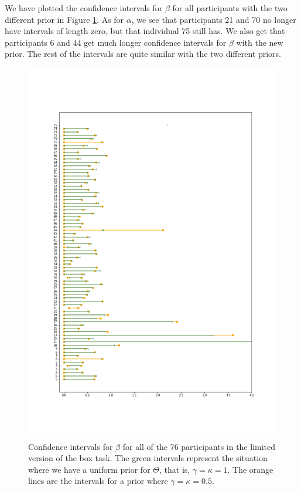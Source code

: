 We have plotted the confidence intervals for $\beta$ for all participants with the two different prior in Figure \ref{fig:sensitivity_ci_lim_beta_zoom}.
As for $\alpha$, we see that participants 21 and 70 no longer have intervals of length zero, but that individual 75 still has. We also get that participants 6 and 44 get much longer confidence intervals for $\beta$ with the new prior. The rest of the intervals are quite similar with the two different priors. 
\begin{figure}
    \centering
    \includegraphics[scale=0.37]{pictures/Sensitivity/ci_lim_beta_zoom1.png}
    \caption[CIs for $\beta$ for all participants with two different priors, limited]{Confidence intervals for $\beta$ for all of the 76 participants in the limited version of the box task. The green intervals represent the situation where we have a uniform prior for $\Theta$, that is, $\gamma=\kappa=1$. The orange lines are the intervals for a prior where $\gamma=\kappa=0.5$.}
    \label{fig:sensitivity_ci_lim_beta_zoom}
\end{figure}

